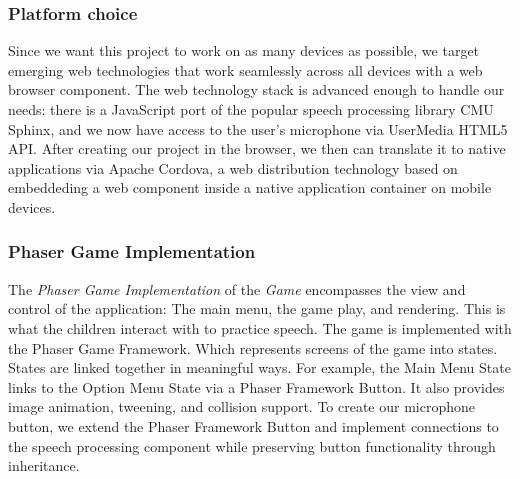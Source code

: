 \documentclass{sig-alternate-2013}
\begin{document}
\subsubsection{Platform choice}
Since we want this project to work on as many devices as possible, we target emerging web technologies that work seamlessly across all devices with a web browser component. The web technology stack is advanced enough to handle our needs: there is a JavaScript port of the popular speech processing library CMU Sphinx, and we now have access to the user's microphone via UserMedia HTML5 API. After creating our project in the browser, we then can translate it to native applications via Apache Cordova, a web distribution technology based on embeddeding a web component inside a native application container on mobile devices.

\subsubsection{Phaser Game Implementation}
The {\em Phaser Game Implementation} of the {\em Game} encompasses the view and control of the application: The main menu, the game play, and rendering. This is what the children interact with to practice speech. The game is implemented with the Phaser Game Framework. Which represents screens of the game into states. States are linked together in meaningful ways. For example, the Main Menu State links to the Option Menu State via a Phaser Framework Button. It also provides image animation, tweening, and collision support. To create our microphone button, we extend the Phaser Framework Button and implement connections to the speech processing component while preserving button functionality through inheritance.
\end{document}
